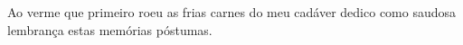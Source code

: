 
\begin{flushright}
\justify
Ao verme que primeiro roeu as frias carnes do meu cadáver dedico como saudosa lembrança estas memórias póstumas.
\end{flushright}


